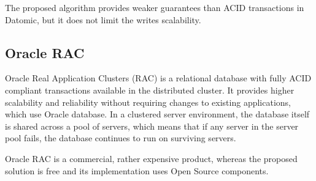 The proposed algorithm provides weaker guarantees than ACID transactions in Datomic, but it does not limit the writes scalability. 


\subsection{Oracle RAC}
Oracle Real Application Clusters (RAC) is a relational database with fully ACID compliant transactions available in the distributed cluster. 
It provides higher scalability and reliability without requiring changes to existing applications, which use Oracle database.
In a clustered server environment, the database
itself is shared across a pool of servers, which means that if any server in the server pool fails,
the database continues to run on surviving servers.

 Oracle RAC is a commercial, rather expensive product, whereas the proposed solution is free and its implementation uses Open Source components.


